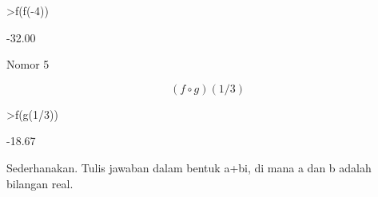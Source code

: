 \documentclass[a4paper,10pt]{article}
\begin{document}
\begin{eulernotebook}
\begin{eulercomment}
\begin{eulercomment}
\begin{eulercomment}
\begin{eulercomment}
\begin{eulercomment}
\begin{eulercomment}
\begin{eulercomment}
\begin{eulercomment}
\begin{eulercomment}
\begin{eulercomment}
\begin{eulercomment}
\begin{eulercomment}
\begin{eulercomment}
\begin{eulercomment}
\begin{eulerprompt}
>f(f(-4))
\end{eulerprompt}
\begin{euleroutput}
       -32.00 
\end{euleroutput}
\begin{eulercomment}
Nomor 5\\
\end{eulercomment}
\begin{eulerformula}
\[
(f \circ g)(1/3)
\]
\end{eulerformula}
\begin{eulerprompt}
>f(g(1/3))
\end{eulerprompt}
\begin{euleroutput}
       -18.67 
\end{euleroutput}
\begin{eulercomment}
Sederhanakan. Tulis jawaban dalam bentuk a+bi, di mana a dan b adalah
bilangan real.


\end{eulercomment}
\end{eulercomment}
\end{eulercomment}
\end{eulercomment}
\end{eulercomment}
\end{eulercomment}
\end{eulercomment}
\end{eulercomment}
\end{eulercomment}
\end{eulercomment}
\end{eulercomment}
\end{eulercomment}
\end{eulercomment}
\end{eulercomment}
\end{eulercomment}
\end{eulernotebook}
\end{document}
